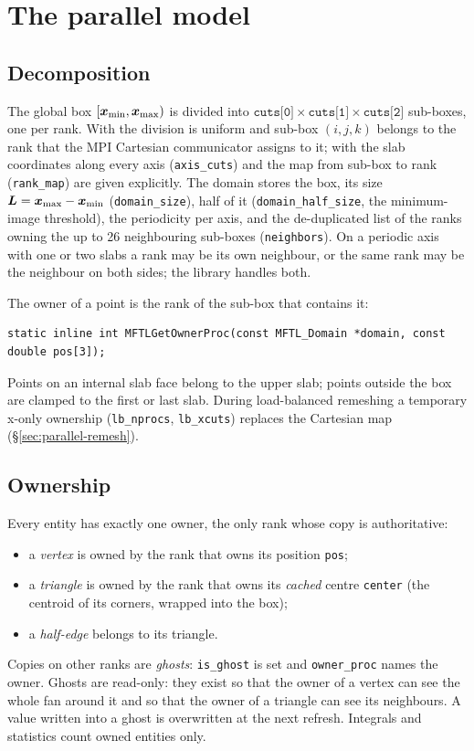 \chapter{The parallel model}
\label{ch:parallel}

\section{Decomposition}

The global box $[\boldsymbol{x}_{\min},\boldsymbol{x}_{\max})$ is divided into
$\texttt{cuts[0]}\times\texttt{cuts[1]}\times\texttt{cuts[2]}$ sub-boxes, one per rank. With
 the division is uniform and sub-box $(i,j,k)$ belongs to the rank that
the MPI Cartesian communicator assigns to it; with  the slab
coordinates along every axis (\texttt{axis\_cuts}) and the map from sub-box to rank
(\texttt{rank\_map}) are given explicitly. The domain stores the box, its size
$\boldsymbol{L}=\boldsymbol{x}_{\max}-\boldsymbol{x}_{\min}$ (\texttt{domain\_size}), half of it
(\texttt{domain\_half\_size}, the minimum-image threshold), the periodicity per axis, and the
de-duplicated list of the ranks owning the up to 26 neighbouring sub-boxes
(\texttt{neighbors}). On a periodic axis with one or two slabs a rank may be its own
neighbour, or the same rank may be the neighbour on both sides; the library handles both.

The owner of a point is the rank of the sub-box that contains it:
\begin{lstlisting}[numbers=none]
static inline int MFTLGetOwnerProc(const MFTL_Domain *domain, const double pos[3]);
\end{lstlisting}
Points on an internal slab face belong to the upper slab; points outside the box are clamped
to the first or last slab. During load-balanced remeshing a temporary x-only ownership
(\texttt{lb\_nprocs}, \texttt{lb\_xcuts}) replaces the Cartesian map (\S\ref{sec:parallel-remesh}).

\section{Ownership}

Every entity has exactly one owner, the only rank whose copy is authoritative:
\begin{itemize}
  \item a \emph{vertex} is owned by the rank that owns its position \texttt{pos};
  \item a \emph{triangle} is owned by the rank that owns its \emph{cached} centre
    \texttt{center} (the centroid of its corners, wrapped into the box);
  \item a \emph{half-edge} belongs to its triangle.
\end{itemize}
Copies on other ranks are \emph{ghosts}: \texttt{is\_ghost} is set and \texttt{owner\_proc} names
the owner. Ghosts are read-only: they exist so that the owner of a vertex can see the whole fan
around it and so that the owner of a triangle can see its neighbours. A value written into a
ghost is overwritten at the next refresh. Integrals and statistics count owned entities only.

